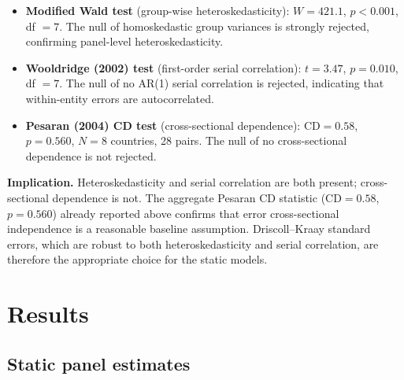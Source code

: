 \begin{itemize}
    \item \textbf{Modified Wald test} (group-wise heteroskedasticity): $W = 421.1$, $p < 0.001$, df $= 7$. The null of homoskedastic group variances is strongly rejected, confirming panel-level heteroskedasticity.

    \item \textbf{Wooldridge (2002) test} (first-order serial correlation): $t = 3.47$, $p = 0.010$, df $= 7$. The null of no AR(1) serial correlation is rejected, indicating that within-entity errors are autocorrelated.

    \item \textbf{Pesaran (2004) CD test} (cross-sectional dependence): $\mathrm{CD} = 0.58$, $p = 0.560$, $N = 8$ countries, 28 pairs. The null of no cross-sectional dependence is not rejected.
\end{itemize}

\noindent\textbf{Implication.} Heteroskedasticity and serial correlation are both present; cross-sectional dependence is not. The aggregate Pesaran CD statistic ($\mathrm{CD} = 0.58$, $p = 0.560$) already reported above confirms that error cross-sectional independence is a reasonable baseline assumption. Driscoll--Kraay standard errors, which are robust to both heteroskedasticity and serial correlation, are therefore the appropriate choice for the static models.

\section{Results}
\label{sec:results}

\subsection{Static panel estimates}
\label{subsec:static-panel-estimates}

